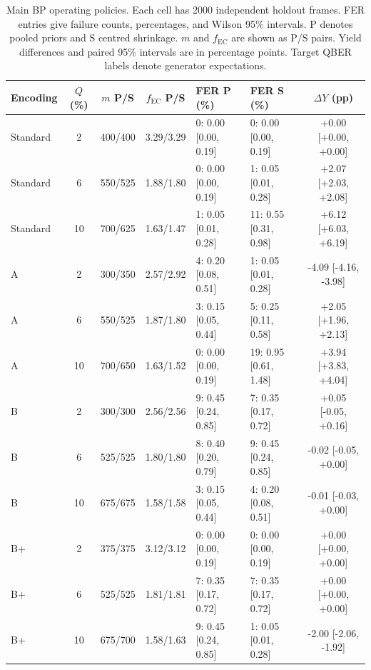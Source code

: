 \begin{table}[htbp]
\centering
\small\setlength{\tabcolsep}{3.2pt}
\caption{Main BP operating policies. Each cell has 2000 independent holdout frames. FER entries give failure counts, percentages, and Wilson 95\% intervals. P denotes pooled priors and S centred shrinkage. $m$ and $f_{\mathrm{EC}}$ are shown as P/S pairs. Yield differences and paired 95\% intervals are in percentage points. Target QBER labels denote generator expectations.}
\label{tab:operating}
\begin{tabular}{@{}lcccllc@{}}
\toprule
Encoding & $Q$ (\%) & $m$ P/S & $f_{\mathrm{EC}}$ P/S & FER P (\%) & FER S (\%) & $\Delta Y$ (pp) \\
\midrule
Standard & 2 & 400/400 & 3.29/3.29 & 0: 0.00 [0.00, 0.19] & 0: 0.00 [0.00, 0.19] & +0.00 [+0.00, +0.00] \\
Standard & 6 & 550/525 & 1.88/1.80 & 0: 0.00 [0.00, 0.19] & 1: 0.05 [0.01, 0.28] & +2.07 [+2.03, +2.08] \\
Standard & 10 & 700/625 & 1.63/1.47 & 1: 0.05 [0.01, 0.28] & 11: 0.55 [0.31, 0.98] & +6.12 [+6.03, +6.19] \\
A & 2 & 300/350 & 2.57/2.92 & 4: 0.20 [0.08, 0.51] & 1: 0.05 [0.01, 0.28] & -4.09 [-4.16, -3.98] \\
A & 6 & 550/525 & 1.87/1.80 & 3: 0.15 [0.05, 0.44] & 5: 0.25 [0.11, 0.58] & +2.05 [+1.96, +2.13] \\
A & 10 & 700/650 & 1.63/1.52 & 0: 0.00 [0.00, 0.19] & 19: 0.95 [0.61, 1.48] & +3.94 [+3.83, +4.04] \\
B & 2 & 300/300 & 2.56/2.56 & 9: 0.45 [0.24, 0.85] & 7: 0.35 [0.17, 0.72] & +0.05 [-0.05, +0.16] \\
B & 6 & 525/525 & 1.80/1.80 & 8: 0.40 [0.20, 0.79] & 9: 0.45 [0.24, 0.85] & -0.02 [-0.05, +0.00] \\
B & 10 & 675/675 & 1.58/1.58 & 3: 0.15 [0.05, 0.44] & 4: 0.20 [0.08, 0.51] & -0.01 [-0.03, +0.00] \\
B+ & 2 & 375/375 & 3.12/3.12 & 0: 0.00 [0.00, 0.19] & 0: 0.00 [0.00, 0.19] & +0.00 [+0.00, +0.00] \\
B+ & 6 & 525/525 & 1.81/1.81 & 7: 0.35 [0.17, 0.72] & 7: 0.35 [0.17, 0.72] & +0.00 [+0.00, +0.00] \\
B+ & 10 & 675/700 & 1.58/1.63 & 9: 0.45 [0.24, 0.85] & 1: 0.05 [0.01, 0.28] & -2.00 [-2.06, -1.92] \\
\bottomrule
\end{tabular}
\end{table}


